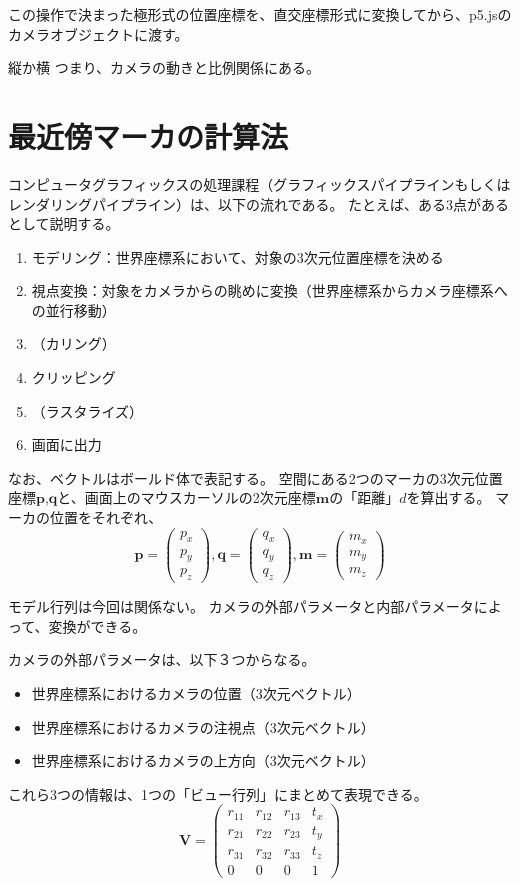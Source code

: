 この操作で決まった極形式の位置座標を、直交座標形式に変換してから、p5.jsのカメラオブジェクトに渡す。



縦か横
つまり、カメラの動きと比例関係にある。




\section{最近傍マーカの計算法}
コンピュータグラフィックスの処理課程（グラフィックスパイプラインもしくはレンダリングパイプライン）は、以下の流れである。
たとえば、ある3点があるとして説明する。
\begin{enumerate}
  \item モデリング：世界座標系において、対象の3次元位置座標を決める
  \item 視点変換：対象をカメラからの眺めに変換（世界座標系からカメラ座標系への並行移動）
  \item （カリング）
  \item クリッピング
  \item （ラスタライズ）
  \item 画面に出力
\end{enumerate}
なお、ベクトルはボールド体で表記する。
空間にある2つのマーカの3次元位置座標$\bm{p}$,$\bm{ q}$と、画面上のマウスカーソルの2次元座標$\bm{m}$の「距離」$d$を算出する。
マーカの位置をそれぞれ、
$$
  \bm{p} =
  \begin{pmatrix}
    {p_x} \\
    {p_y} \\
    {p_z}
  \end{pmatrix}
  ,
  \bm{q} =
  \begin{pmatrix}
    {q_x} \\
    {q_y} \\
    {q_z}
  \end{pmatrix}
  ,
  \bm{m} =
  \begin{pmatrix}
    {m_x} \\
    {m_y} \\
    {m_z}
  \end{pmatrix}
$$

モデル行列は今回は関係ない。
カメラの外部パラメータと内部パラメータによって、変換ができる。

カメラの外部パラメータは、以下３つからなる。
\begin{itemize}
  \item 世界座標系におけるカメラの位置（3次元ベクトル）
  \item 世界座標系におけるカメラの注視点（3次元ベクトル）
  \item 世界座標系におけるカメラの上方向（3次元ベクトル）
\end{itemize}
これら3つの情報は、1つの「ビュー行列」にまとめて表現できる。
$$
\mathbf{V} = 
\begin{pmatrix}
r_{11} & r_{12} & r_{13} & t_x \\
r_{21} & r_{22} & r_{23} & t_y \\
r_{31} & r_{32} & r_{33} & t_z \\
0 & 0 & 0 & 1
\end{pmatrix}
$$


